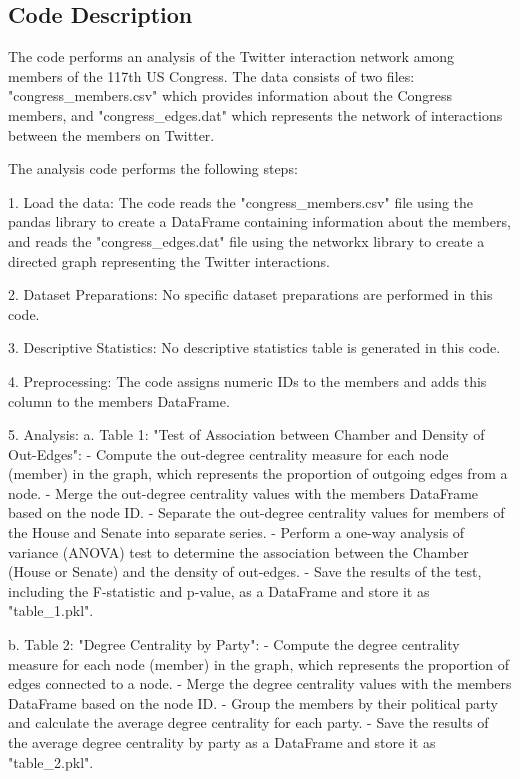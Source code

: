 \documentclass[11pt]{article}
\begin{document}
\subsection{Code Description}

The code performs an analysis of the Twitter interaction network among members of the 117th US Congress. The data consists of two files: "congress\_members.csv" which provides information about the Congress members, and "congress\_edges.dat" which represents the network of interactions between the members on Twitter.

The analysis code performs the following steps:

1. Load the data: The code reads the "congress\_members.csv" file using the pandas library to create a DataFrame containing information about the members, and reads the "congress\_edges.dat" file using the networkx library to create a directed graph representing the Twitter interactions.

2. Dataset Preparations: No specific dataset preparations are performed in this code.

3. Descriptive Statistics: No descriptive statistics table is generated in this code.

4. Preprocessing: The code assigns numeric IDs to the members and adds this column to the members DataFrame.

5. Analysis:
    a. Table 1: "Test of Association between Chamber and Density of Out-Edges":
        - Compute the out-degree centrality measure for each node (member) in the graph, which represents the proportion of outgoing edges from a node.
        - Merge the out-degree centrality values with the members DataFrame based on the node ID.
        - Separate the out-degree centrality values for members of the House and Senate into separate series.
        - Perform a one-way analysis of variance (ANOVA) test to determine the association between the Chamber (House or Senate) and the density of out-edges.
        - Save the results of the test, including the F-statistic and p-value, as a DataFrame and store it as "table\_1.pkl".
    
    b. Table 2: "Degree Centrality by Party":
        - Compute the degree centrality measure for each node (member) in the graph, which represents the proportion of edges connected to a node.
        - Merge the degree centrality values with the members DataFrame based on the node ID.
        - Group the members by their political party and calculate the average degree centrality for each party.
        - Save the results of the average degree centrality by party as a DataFrame and store it as "table\_2.pkl".
    
\end{document}
